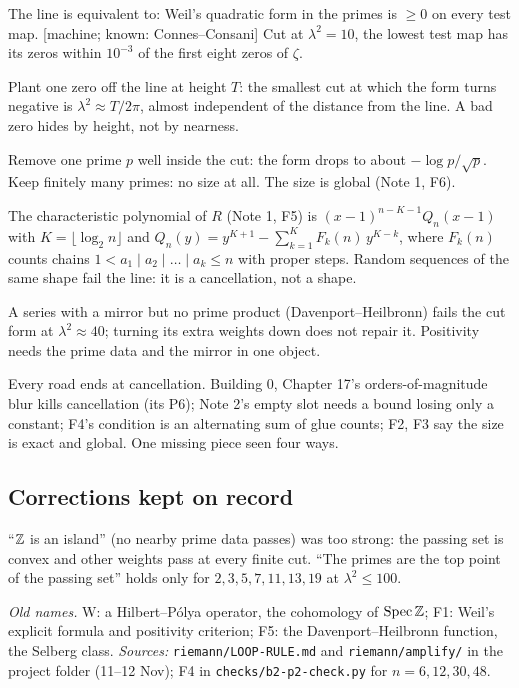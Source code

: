 \begin{lines}
\item[\lab{F1}] [reported] The line is equivalent to: Weil's quadratic form in the primes is $\ge 0$ on every test map. [machine; known: Connes--Consani] Cut at $\lambda^2 = 10$, the lowest test map has its zeros within $10^{-3}$ of the first eight zeros of $\zeta$.
\item[\lab{F2}] [machine; unchecked] Plant one zero off the line at height $T$: the smallest cut at which the form turns negative is $\lambda^2 \approx T/2\pi$, almost independent of the distance from the line. A bad zero hides by height, not by nearness.
\item[\lab{F3}] [machine] Remove one prime $p$ well inside the cut: the form drops to about $-\log p/\sqrt p$. Keep finitely many primes: no size at all. The size is global (Note 1, F6).
\item[\lab{F4}] [machine to $n = 300$; probably known] The characteristic polynomial of $R$ (Note 1, F5) is $(x - 1)^{n - K - 1}Q_n(x - 1)$ with $K = \lfloor \log_2 n\rfloor$ and $Q_n(y) = y^{K+1} - \sum_{k=1}^{K} F_k(n)\,y^{K-k}$, where $F_k(n)$ counts chains $1 < a_1 \mid a_2 \mid \dots \mid a_k \le n$ with proper steps. Random sequences of the same shape fail the line: it is a cancellation, not a shape.
\item[\lab{F5}] [machine] A series with a mirror but no prime product (Davenport--Heilbronn) fails the cut form at $\lambda^2 \approx 40$; turning its extra weights down does not repair it. Positivity needs the prime data and the mirror in one object.
\item[\lab{F6}] [unchecked; a reading] Every road ends at cancellation. Building 0, Chapter 17's orders-of-magnitude blur kills cancellation (its P6); Note 2's empty slot needs a bound losing only a constant; F4's condition is an alternating sum of glue counts; F2, F3 say the size is exact and global. One missing piece seen four ways.
\end{lines}

\subsection*{Corrections kept on record}

``$\mathbb{Z}$ is an island'' (no nearby prime data passes) was too strong: the passing set is convex and other weights pass at every finite cut. ``The primes are the top point of the passing set'' holds only for $2, 3, 5, 7, 11, 13, 19$ at $\lambda^2 \le 100$.

\noindent\emph{Old names.} W: a Hilbert--P\'olya operator, the cohomology of $\operatorname{Spec}\mathbb{Z}$; F1: Weil's explicit formula and positivity criterion; F5: the Davenport--Heilbronn function, the Selberg class. \emph{Sources:} \texttt{riemann/LOOP-RULE.md} and \texttt{riemann/amplify/} in the project folder (11--12 Nov); F4 in \texttt{checks/b2-p2-check.py} for $n = 6, 12, 30, 48$.


